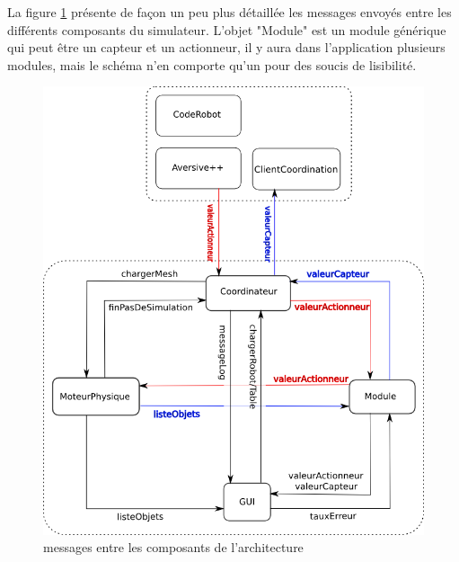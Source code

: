 

La figure \ref{messagearchitecture} présente de façon un peu plus détaillée les messages envoyés entre les différents composants du simulateur.
L'objet "Module" est un module générique qui peut être un capteur et un actionneur, il y aura dans l'application plusieurs modules, mais le schéma 
n'en comporte qu'un pour des soucis de lisibilité.


\begin{figure}
\includegraphics[scale=0.70]{architecturemsg.png}
\caption{messages entre les composants de l'architecture}
\label{messagearchitecture}
\end{figure}
\vspace{5 mm}
